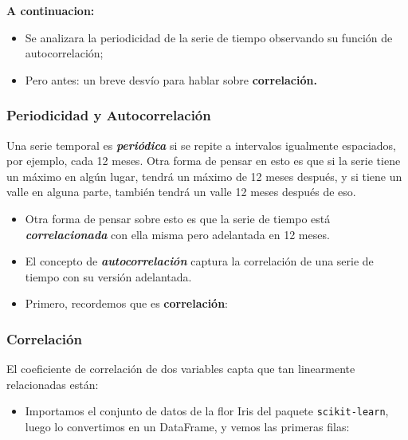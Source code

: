\documentclass[11pt]{article}
\providecommand{\tightlist}{%
      \setlength{\itemsep}{0pt}\setlength{\parskip}{0pt}}
\begin{document}
\textbf{A continuacion:}

\begin{itemize}
\tightlist
\item
  Se analizara la periodicidad de la serie de tiempo observando su
  función de autocorrelación;
\item
  Pero antes: un breve desvío para hablar sobre \textbf{correlación.}
\end{itemize}

    \subsubsection{Periodicidad y
Autocorrelación}\label{periodicidad-y-autocorrelaciuxf3n}

    Una serie temporal es \textbf{\emph{periódica}} si se repite a
intervalos igualmente espaciados, por ejemplo, cada 12 meses. Otra forma
de pensar en esto es que si la serie tiene un máximo en algún lugar,
tendrá un máximo de 12 meses después, y si tiene un valle en alguna
parte, también tendrá un valle 12 meses después de eso.

\begin{itemize}
\item
  Otra forma de pensar sobre esto es que la serie de tiempo está
  \textbf{\emph{correlacionada}} con ella misma pero adelantada en 12
  meses.
\item
  El concepto de \textbf{\emph{autocorrelación}} captura la correlación
  de una serie de tiempo con su versión adelantada.
\item
  Primero, recordemos que es \textbf{correlación}:
\end{itemize}

    \subsubsection{Correlación}\label{correlaciuxf3n}

    El coeficiente de correlación de dos variables capta que tan linearmente
relacionadas están:

    \begin{itemize}
\tightlist
\item
  Importamos el conjunto de datos de la flor Iris del paquete
  \texttt{scikit-learn}, luego lo convertimos en un DataFrame, y vemos
  las primeras filas:
\end{itemize}

    
\end{document}

